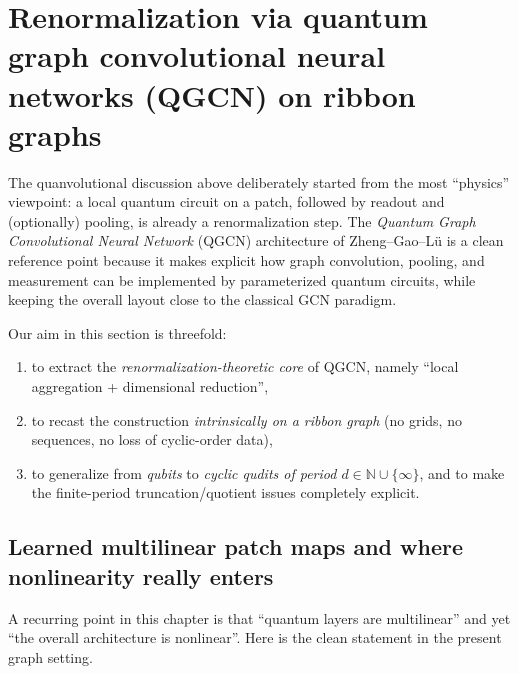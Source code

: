 \documentclass[11pt,oneside]{amsbook}
\numberwithin{equation}{section}
\theoremstyle{plain}
\theoremstyle{definition}
\theoremstyle{remark}
\begin{document}
\section{Renormalization via quantum graph convolutional neural networks (QGCN) on ribbon graphs}
\label{sec:qgcn_renorm}

The quanvolutional discussion above deliberately started from the most ``physics'' viewpoint:
a local quantum circuit on a patch, followed by readout and (optionally) pooling, is already a
renormalization step.  The \emph{Quantum Graph Convolutional Neural Network} (QGCN) architecture
of Zheng--Gao--L\"u \cite{Zheng2021QGCN} is a clean reference point because it makes explicit how
graph convolution, pooling, and measurement can be implemented by parameterized quantum circuits,
while keeping the overall layout close to the classical GCN paradigm.

Our aim in this section is threefold:
\begin{enumerate}
\item to extract the \emph{renormalization-theoretic core} of QGCN, namely ``local aggregation + dimensional reduction'',
\item to recast the construction \emph{intrinsically on a ribbon graph} (no grids, no sequences, no loss of cyclic-order data),
\item to generalize from \emph{qubits} to \emph{cyclic qudits of period $d\in\mathbb{N}\cup\{\infty\}$}, and to make the
finite-period truncation/quotient issues completely explicit.
\end{enumerate}

\subsection{Learned multilinear patch maps and where nonlinearity really enters}
\label{subsec:qgcn_multilinear}

A recurring point in this chapter is that ``quantum layers are multilinear'' and yet ``the overall architecture is nonlinear''.
Here is the clean statement in the present graph setting.
\end{document}
